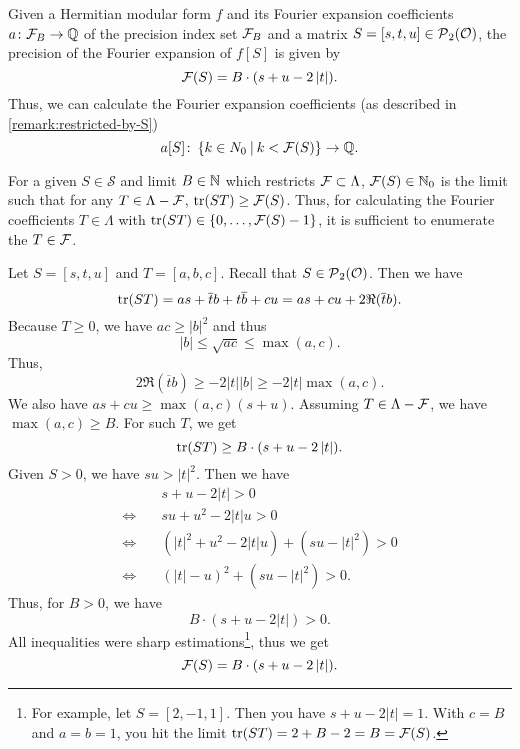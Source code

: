\begin{lemma}
\label{lemma:fprecisionlimit}
Given a Hermitian modular form $f$ and its Fourier expansion coefficients $a \colon \mathcal{F}_B \rightarrow \mathbb{Q}$ of the precision index set $\mathcal{F}_B$ and a matrix $S = [s,t,u] \in \operatorname{\mathcal{P}}_2(\mathcal{O})$, the precision of the Fourier expansion of $f[S]$ is given by
\[ \mathcal{F}(S) = B \cdot (s + u - 2 \left| t \right|) . \]
Thus, we can calculate the Fourier expansion coefficients (as described in \cref{remark:restricted-by-S})
\[ a[S] \colon \Set{k \in N_0}{k < \FPrecisionLimit{S}} \rightarrow \Q . \]

\proof
For a given $S \in \mathcal{S}$ and limit $B \in \mathbb{N}$ which restricts $\mathcal{F} \subset \Lambda$, $\mathcal{F}(S) \in \mathbb{N}_0$ is the limit such that for any $T \in \Lambda - \mathcal{F}$, $\textup{\textrm{tr}}(S T) \ge \mathcal{F}(S)$. Thus, for calculating the Fourier coefficients $T \in \Lambda$ with $\tr(S T) \in \Set{0, \dots, \FPrecisionLimit{S} - 1}$, it is sufficient to enumerate the $T \in \mathcal{F}$.

Let $S = [s,t,u]$ and $T = [a,b,c]$. Recall that $S \in \operatorname{\mathcal{P}}_2(\mathcal{O})$. Then we have
\[ \textup{\textrm{tr}}(S T) = as + \overline{t} b + t \overline{b} + cu = as + cu + 2 \Re(\overline{t} b) . \]
Because $T \ge 0$, we have $ac \ge \left| b \right|^2$ and thus
\[ \left| b \right| \le \sqrt{ac} \le \max(a,c). \]
Thus,
\[ 2 \Re(\overline{t} b) \ge -2 \left| t \right| \left| b \right| \ge -2 \left| t \right| \max(a,c). \]
We also have $as + cu \ge \max(a,c) (s + u)$. Assuming $T \in \Lambda - \mathcal{F}$, we have $\max(a,c) \ge B$. For such $T$, we get
\[ \textup{\textrm{tr}}(ST) \ge B \cdot (s + u - 2 \left| t \right|) . \]
Given $S > 0$, we have $su > \left| t \right|^2$. Then we have
\begin{align*}
& s + u - 2 \left| t \right| > 0 \\
\Leftrightarrow \quad & su + u^2 - 2 \left| t \right| u > 0 \\
\Leftrightarrow \quad & \left( \left|t\right|^2 + u^2 - 2 \left| t \right| u \right) + (su - \left|t \right|^2) > 0 \\
\Leftrightarrow \quad & \left(\left| t \right| - u \right)^2 + (su - \left| t \right|^2) > 0 .
\end{align*}
Thus, for $B > 0$, we have
\[ B \cdot (s + u - 2 \left| t \right|) > 0 . \]
All inequalities were sharp estimations\footnote{For example, let $S=[2,-1,1]$. Then you have $s+u-2 \left| t \right| = 1$. With $c=B$ and $a=b=1$, you hit the limit $\textup{\textrm{tr}}(S T) = 2 + B - 2 = B = \mathcal{F}(S)$. }, %
thus we get
\[ \mathcal{F}(S) = B \cdot (s + u - 2 \left| t \right|) . \]
\endproof
\end{lemma}

